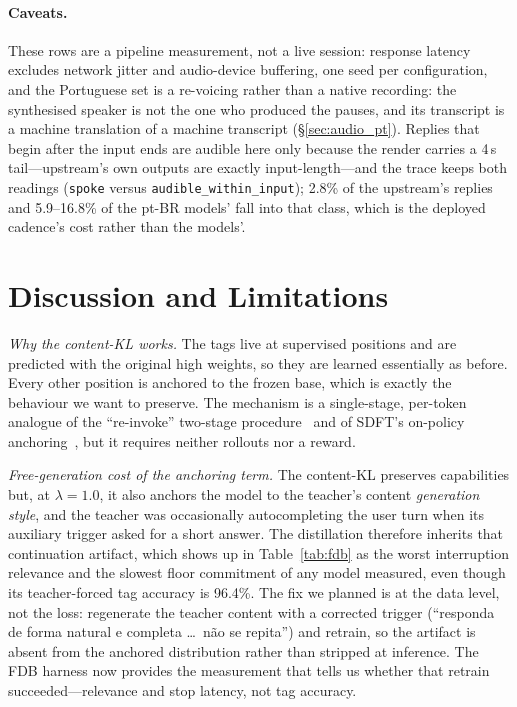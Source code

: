 \documentclass[conference]{IEEEtran}
\begin{document}
\paragraph{Caveats.} These rows are a pipeline measurement, not a live session:
response latency excludes network jitter and audio-device buffering, one seed per
configuration, and the Portuguese set is a re-voicing rather than a native
recording: the synthesised speaker is not the one who produced the pauses, and
its transcript is a machine translation of a machine transcript
(\S\ref{sec:audio_pt}). Replies that begin after the input ends
are audible here only because the render carries a 4\,s tail---upstream's own
outputs are exactly input-length---and the trace keeps both readings
(\texttt{spoke} versus \texttt{audible\_within\_input}); 2.8\% of the upstream's
replies and 5.9--16.8\% of the pt-BR models' fall into that class, which is the
deployed cadence's cost rather than the models'.

\section{Discussion and Limitations}
\label{sec:discussion}

\emph{Why the content-KL works.} The tags live at supervised positions and are
predicted with the original high weights, so they are learned essentially as
before. Every other position is anchored to the frozen base, which is exactly the
behaviour we want to preserve. The mechanism is a single-stage, per-token analogue
of the ``re-invoke'' two-stage procedure~\cite{tml2025} and of SDFT's on-policy
anchoring~\cite{selfdistill2026}, but it requires neither rollouts nor a reward.

\emph{Free-generation cost of the anchoring term.} The content-KL preserves
capabilities but, at $\lambda{=}1.0$, it also anchors the model to the teacher's
content \emph{generation style}, and the teacher was occasionally autocompleting
the user turn when its auxiliary trigger asked for a short answer. The
distillation therefore inherits that continuation artifact, which shows up in
Table~\ref{tab:fdb} as the worst interruption relevance and the slowest floor
commitment of any model measured, even though its teacher-forced tag accuracy is
96.4\%. The fix we planned is at the data level, not the loss: regenerate the
teacher content with a corrected trigger (``responda de forma natural e completa
\ldots\ não se repita'') and retrain, so the artifact is absent from the anchored
distribution rather than stripped at inference. The FDB harness now provides the
measurement that tells us whether that retrain succeeded---relevance and stop
latency, not tag accuracy.
\end{document}
